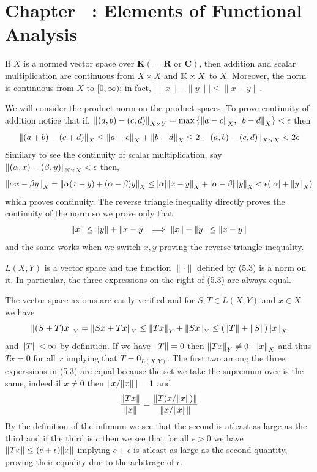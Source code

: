 \documentclass[12pt,a4paper]{article}
\begin{document}
\section*{Chapter \thesection\ : Elements of Functional Analysis}
\begin{problem}\label{prob:5-1}
    If $X$ is a normed vector space over $\mathbf{K}(=\mathbf{R} \text{ or } \mathbf{C})$, then addition and scalar multiplication are continuous from $X \times X$ and $\mathbb{K} \times X$ to $X$. Moreover, the norm is continuous from $X$ to $[0,\infty)$; in fact, $\left| \|x\| - \|y\| \right| \le \|x-y\|$.
\end{problem}
\begin{solution}
We will consider the product norm on the product spaces. 
To prove continuity of addition notice that if, $\norm{(a,b)-(c,d)}_{X\times Y}=\max \qty{\norm{a-c}_X,\norm{b-d}_X}<\epsilon$ then 
\[
    \norm{(a+b)-(c+d)}_{X} \leq \norm{a-c}_X+\norm{b-d}_X \leq 2\cdot\norm{(a,b)-(c,d)}_{X\times X}<2\epsilon
\]
Similary to see the continuity of scalar multiplication, say $\norm{(\alpha,x)-(\beta,y)}_{\mathbb{K}\times X}<\epsilon$ then, 
\[
    \norm{\alpha x-\beta y}_{X}=\norm{\alpha(x-y)+(\alpha -\beta)y}_X\leq|\alpha|\norm{x-y}_X+|\alpha-\beta|\norm{y}_X<\epsilon(|\alpha|+\norm{y}_X)
\]
which proves continuity. 
The reverse triangle inequality directly proves the continuity of the norm so we prove only that
\[
    \norm{x}\leq\norm{y}+\norm{x-y}\implies\norm{x}-\norm{y}\leq\norm{x-y}
\]
and the same works when we switch $x,y$ proving the reverse triangle inequality. 
\end{solution}
\begin{problem}\label{prob:5-2}
$L(X,Y)$ is a vector space and the function $\|\cdot\|$ defined by (5.3) is a norm on it. In particular, the three expressions on the right of (5.3) are always equal.
\end{problem}
\begin{solution}
The vector space axioms are easily verified and for $S,T\in L(X,Y)$ and $x\in X$ we have 
\[
    \norm{(S+T)x}_Y=\norm{Sx+Tx}_Y\leq\norm{Tx}_Y+\norm{Sx}_Y\leq(\norm{T}+\norm{S})\norm{x}_X
\]
and $\norm{T}<\infty$ by definition. 
If we have $\norm{T}=0$ then $\norm{Tx}_Y\neq 0\cdot\norm{x}_X$ and thus $Tx=0$ for all $x$ implying that $T=0_{L(X,Y)}.$  
The first two among the three experssions in (5.3) are equal because the set we take the supremum over is the same, indeed if $x\neq 0$ then $\norm{x/\norm{x}}=1$ and 
\[
    \frac{\norm{Tx}}{\norm{x}}= \frac{\norm{T(x/\norm{x})}}{\norm{x/\norm{x}}}
\]
By the definition of the infimum we see that the second is atleast as large as the third and if the third is $c$ then we see that for all $\epsilon>0$ we have $\norm{Tx}\leq(c+\epsilon)\norm{x}$ implying $c+\epsilon$ is atleast as large as the second quantity, proving their equality due to the arbitrage of $\epsilon.$ 
\end{solution}
\end{document}
